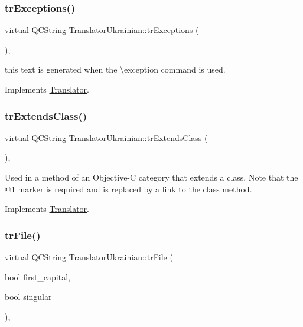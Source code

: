 \subsubsection{\texorpdfstring{trExceptions()}{trExceptions()}}
{\footnotesize\ttfamily virtual \mbox{\hyperlink{class_q_c_string}{Q\+C\+String}} Translator\+Ukrainian\+::tr\+Exceptions (\begin{DoxyParamCaption}{ }\end{DoxyParamCaption})\hspace{0.3cm}{\ttfamily [inline]}, {\ttfamily [virtual]}}

this text is generated when the \textbackslash{}exception command is used. 

Implements \mbox{\hyperlink{class_translator}{Translator}}.

\mbox{\label{class_translator_ukrainian_a5e746b819ffd15c130c4f3551f14e5c7}} 
\subsubsection{\texorpdfstring{trExtendsClass()}{trExtendsClass()}}
{\footnotesize\ttfamily virtual \mbox{\hyperlink{class_q_c_string}{Q\+C\+String}} Translator\+Ukrainian\+::tr\+Extends\+Class (\begin{DoxyParamCaption}{ }\end{DoxyParamCaption})\hspace{0.3cm}{\ttfamily [inline]}, {\ttfamily [virtual]}}

Used in a method of an Objective-\/C category that extends a class. Note that the @1 marker is required and is replaced by a link to the class method. 

Implements \mbox{\hyperlink{class_translator}{Translator}}.

\mbox{\label{class_translator_ukrainian_a6116ea6f31dbc5b6d0979d019701bb33}} 
\subsubsection{\texorpdfstring{trFile()}{trFile()}}
{\footnotesize\ttfamily virtual \mbox{\hyperlink{class_q_c_string}{Q\+C\+String}} Translator\+Ukrainian\+::tr\+File (\begin{DoxyParamCaption}\item[{bool}]{first\+\_\+capital,  }\item[{bool}]{singular }\end{DoxyParamCaption})\hspace{0.3cm}{\ttfamily [inline]}, {\ttfamily [virtual]}}

